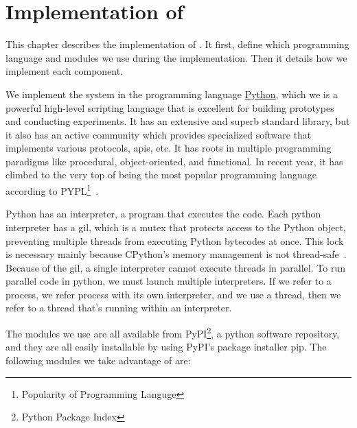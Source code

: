 

\chapter{Implementation of \project}\label{ch:implementation}\glsresetall
This chapter describes the implementation of \project. It first, define which programming language and modules we use during the implementation. Then it details how we implement each component.

We implement the system in the programming language \href{https://www.python.org/}{Python}, which we is a powerful high-level scripting language that is excellent for building prototypes and conducting experiments. It has an extensive and superb standard library, but it also has an active community which provides specialized software that implements various protocols, \acp{api}, etc. It has roots in multiple programming paradigms like procedural, object-oriented, and functional. In recent year, it has climbed to the very top of being the most popular programming language according to PYPL\footnote{Popularity of Programming Languge}~\cite{pypl_python}.

Python has an interpreter, a program that executes the code. Each python interpreter has a \ac{gil}, which is a mutex that protects access to the Python object, preventing multiple threads from executing Python bytecodes at once. This lock is necessary mainly because CPython's memory management is not thread-safe~\cite{python_gil}. Because of the \ac{gil}, a single interpreter cannot execute threads in parallel. To run parallel code in python, we must launch multiple interpreters. If we refer to a process, we refer process with its own interpreter, and we use a thread, then we refer to a thread that's running within an interpreter.

The modules we use are all available from PyPI\footnote{Python Package Index}, a python software repository, and they are all easily installable by using PyPI's package installer pip. The following modules we take advantage of are:

